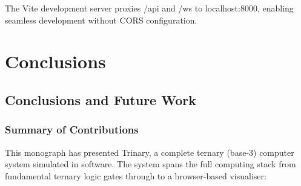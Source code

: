 \documentclass[12pt,a4paper,twoside]{book}
\theoremstyle{trinarytheorem}
\theoremstyle{trinarydefinition}
\newcommand{\code}[1]{\textsf{#1}}
\begin{document}
The Vite development server proxies \code{/api} and \code{/ws} to
\code{localhost:8000}, enabling seamless development without CORS
configuration.

\part{Conclusions}

\chapter{Conclusions and Future Work}
\label{ch:conclusions}

\section{Summary of Contributions}

This monograph has presented Trinary, a complete ternary (base-3) computer
system simulated in software. The system spans the full computing stack
from fundamental ternary logic gates through to a browser-based
visualiser:
\end{document}
